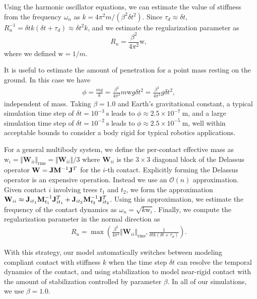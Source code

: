 Using the harmonic oscillator equations, we can estimate the value of stiffness
from the frequency $\omega_n$ as $k=4\pi^2 m/(\beta^2 \delta t^2)$. Since
$\tau_d\approx\delta t$, $R_n^{-1} = \delta t k(\delta t+\tau_d) \approx \delta
t^2k$, and we estimate the regularization parameter as
\begin{equation*}
	R_n = \frac{\beta^2}{4\pi^2}\text{w},
\end{equation*}
where we defined $\text{w}=1/m$.

It is useful to estimate the amount of penetration for a point mass resting on
the ground. In this case we have
\begin{align*}
	\phi = \frac{mg}{k} = \frac{\beta^2}{4\pi^2}m\text{w}g\delta t^2 = \frac{\beta^2}{4\pi^2}g\delta t^2,
\end{align*}
independent of mass. Taking $\beta=1.0$ and Earth's gravitational constant, a
typical simulation time step of $\delta t=10^{-3}~\text{s}$ leads to
$\phi\approx 2.5\times 10^{-7}~\text{m}$, and a large simulation time step of
$\delta t=10^{-2}~\text{s}$ leads to $\phi\approx 2.5\times 10^{-5}~\text{m}$,
well within acceptable bounds to consider a body rigid for typical robotics
applications.

For a general multibody system, we define the per-contact effective mass as
$\text{w}_i=\Vert\mathbf{W}_{ii}\Vert_\text{rms}=\Vert\mathbf{W}_{ii}\Vert/3$
where $\mathbf{W}_{ii}$ is the $3\times 3$ diagonal block of the Delassus
operator $\mathbf{W}={\mathbf{J}}{\mathbf{M}}^{-1}{\mathbf{J}}^T$ for the $i$-th contact.
Explicitly forming the Delassus operator is an expensive operation. Instead we
use an $\mathcal{O}(n)$ approximation. Given contact $i$ involving trees $t_1$
and $t_2$, we form the approximation $\mathbf{W}_{ii}\approx{\mathbf{J}}_{i
t_1}{\mathbf{M}}_{t_1}^{-1}{\mathbf{J}}_{i t_1}^T+{\mathbf{J}}_{i t_2}{\mathbf{M}}_{t_2}^{-1}{\mathbf{J}}_{i
t_2}^T$. Using this approximation, we estimate the frequency of the contact
dynamics as $\omega_n=\sqrt{k\text{w}_i}$. Finally, we compute the
regularization parameter in the normal direction as
\begin{eqnarray}
    R_n = \max\left(\frac{\beta^2}{4\pi^2}\Vert\mathbf{W}_{ii}\Vert_\text{rms},
    \frac{1}{\delta t k(\delta t+\tau_d)}\right)
    \label{eq:normal_regularization}.
\end{eqnarray}

With this strategy, our model automatically switches between modeling compliant
contact with stiffness $k$ when the time step $\delta t$ can resolve the
temporal dynamics of the contact, and using stabilization to model near-rigid
contact with the amount of stabilization controlled by parameter $\beta$. In all
of our simulations, we use $\beta=1.0$.


